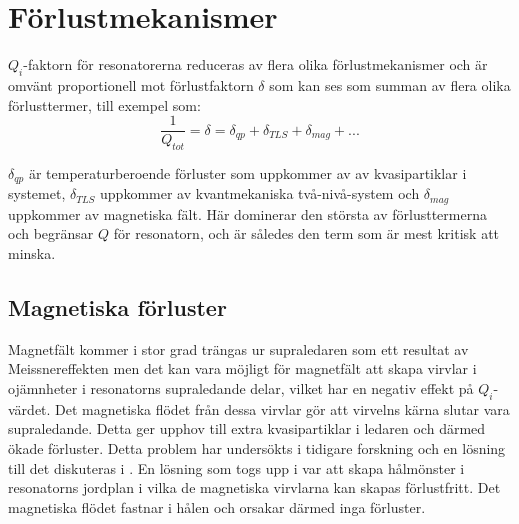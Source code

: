 \documentclass[main.tex]{subfiles}
\begin{document}


\section{Förlustmekanismer}
\label{sec:losses}
$Q_i$-faktorn för resonatorerna reduceras av flera olika förlustmekanismer och är omvänt proportionell mot förlustfaktorn $\delta$ som kan ses som summan av flera olika förlusttermer\cite{Boehme2016,Goetz2016}, till exempel som:
\begin{equation}
    \label{ekv:Qtot}
    \frac{1}{Q_{tot}}=\delta=\delta_{qp}+\delta_{TLS}+\delta_{mag}+...
\end{equation}
\noindent

$\delta_{qp}$ är temperaturberoende förluster som uppkommer av av kvasipartiklar i systemet, $\delta_{TLS}$ uppkommer av kvantmekaniska två-nivå-system och $\delta_{mag}$ uppkommer av magnetiska fält. Här dominerar den största av förlusttermerna och begränsar $Q$ för resonatorn, och är således den term som är mest kritisk att minska.



\subsection{Magnetiska förluster}
\label{sek:mag}
Magnetfält kommer i stor grad trängas ur supraledaren som ett resultat av Meissnereffekten \cite{Kittel2005} men det kan vara möjligt för magnetfält att skapa virvlar i ojämnheter i resonatorns supraledande delar, vilket har en negativ effekt på $Q_i$-värdet. Det magnetiska flödet från dessa virvlar gör att virvelns kärna slutar vara supraledande. Detta ger upphov till extra kvasipartiklar i ledaren och därmed ökade förluster. Detta problem har undersökts i tidigare forskning och en lösning till det diskuteras i \cite{Chiaro2016}. En lösning som togs upp i var att skapa hålmönster i resonatorns jordplan i vilka de magnetiska virvlarna kan skapas förlustfritt\cite{Chiaro2016}. Det magnetiska flödet fastnar i hålen och orsakar därmed inga förluster\cite{Chiaro2016}.
\end{document}

